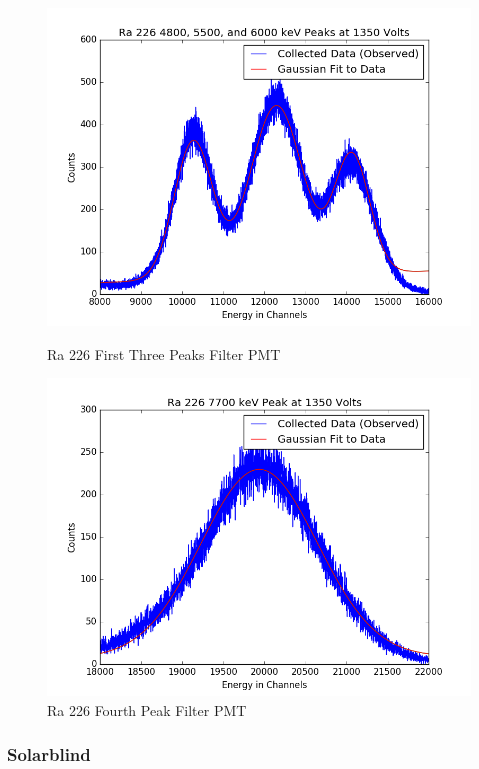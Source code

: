 \documentclass{article}
\begin{document}
\begin{figure}[H]
  \centering
  \begin{minipage}[b]{0.4\textwidth}
    \includegraphics[width=\textwidth]{FilRa1fit.png}
    \caption{Ra 226 First Three Peaks Filter PMT}
  \end{minipage}
  \hfill
  \begin{minipage}[b]{0.4\textwidth}
    \includegraphics[width=\textwidth]{FilRa4fit.png}
    \caption{Ra 226 Fourth Peak Filter PMT}
  \end{minipage}
\end{figure}

\subsubsection{Solarblind}
\end{document}
